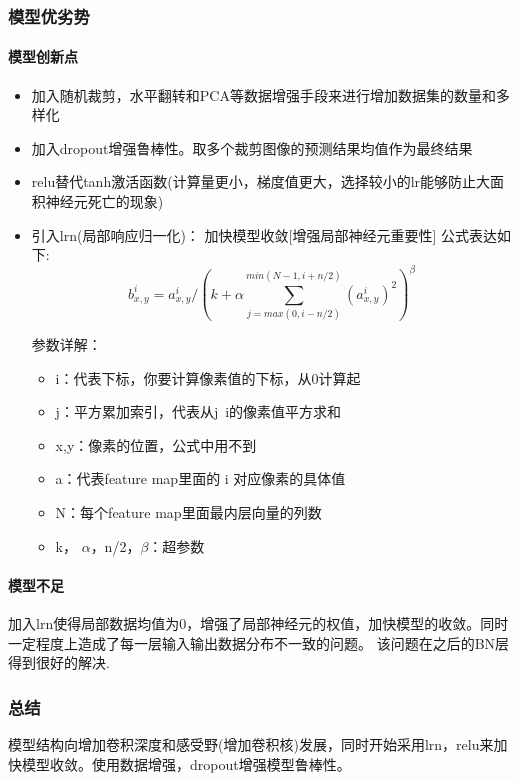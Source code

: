 \documentclass{article}
\newcommand{\tao}[1]{\todo[color=red!20,size=\footnotesize]{T: #1}{}}
\begin{document}
\begin{CJK}{UTF8}{gbsn}
\subsubsection{模型优劣势}
\paragraph{模型创新点}
\begin{itemize}
\item 加入随机裁剪，水平翻转和PCA等数据增强手段来进行增加数据集的数量和多样化
\item 加入dropout增强鲁棒性。取多个裁剪图像的预测结果均值作为最终结果
\item relu替代tanh激活函数(计算量更小，梯度值更大，选择较小的lr能够防止大面积神经元死亡的现象)
\item 引入lrn(局部响应归一化)： 加快模型收敛[增强局部神经元重要性] 公式表达如下:
\begin{equation}
    b_{x,y}^i = a_{x,y}^i / (k +\alpha \sum_{j=max(0,i-n/2)}^{min(N-1,i+n/2)} (a_{x,y}^i)^2)^\beta
\end{equation}

参数详解：
    \begin{itemize}
    \item i：代表下标，你要计算像素值的下标，从0计算起
    \item j：平方累加索引，代表从j~i的像素值平方求和
    \item x,y：像素的位置，公式中用不到
    \item a：代表feature map里面的 i 对应像素的具体值
    \item N：每个feature map里面最内层向量的列数
    \item k， $\alpha$，n/2，$\beta$：超参数
    \end{itemize}
\end{itemize}


\paragraph{模型不足}
加入lrn使得局部数据均值为0，增强了局部神经元的权值，加快模型的收敛。同时一定程度上造成了每一层输入输出数据分布不一致的问题。
该问题在之后的BN层得到很好的解决.


\subsubsection{总结}
模型结构向增加卷积深度和感受野(增加卷积核)发展，同时开始采用lrn，relu来加快模型收敛。使用数据增强，dropout增强模型鲁棒性。



\end{CJK}
\end{document}
